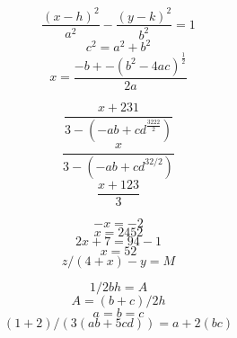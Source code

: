 \documentclass{article}
\begin{document}
\[ \frac{(x-h)^2}{a^2} - \frac{(y-k)^2}{b^2} = 1\]
\[ c^2 = a^2 + b^2 \]
\[ x = \frac{-b+-(b^2-4ac)^{\frac{1}{2}}}{2a} \]

\[ \frac{x+231}{3-(-ab + cd^\frac{3222}{2})} \]
\[ \frac{x}{3-(-ab + cd^{32/2})} \]
\[ \frac{x+123}{3} \]

\[ -x = -2 \]
\[ x=2452 \] 
\[ 2x + 7 = 94 - 1 \] 
\[ x = 52 \] 
\[ z/(4 + x) - y = M \]

\[ 1/2bh = A \]
\[ A = (b+c)/2h \]
\[ a=b=c \]
\[ (1+2)/(3(ab+5cd))=a+2(bc) \]
\end{document}
